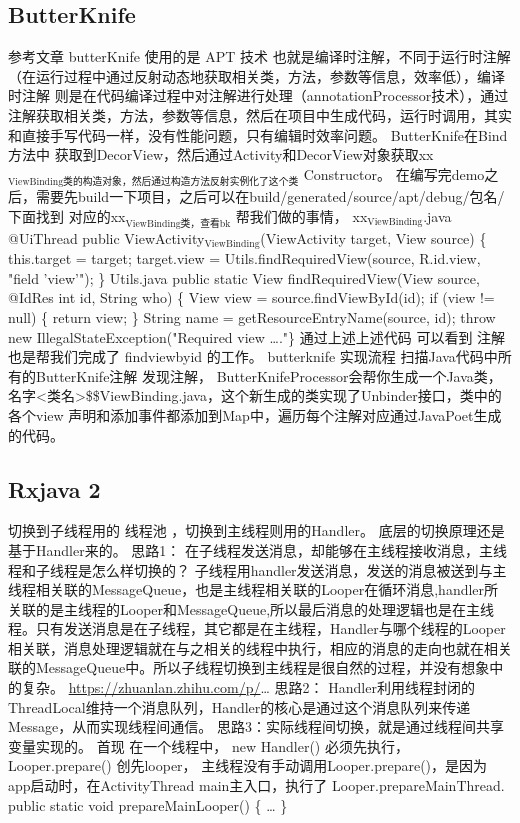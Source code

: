 \documentclass[9pt, b5paper]{article}
\begin{document}
\subsection{ButterKnife}
\label{sec-8-3}
参考文章
butterKnife 使用的是 APT 技术 也就是编译时注解，不同于运行时注解（在运行过程中通过反射动态地获取相关类，方法，参数等信息，效率低），编译时注解 则是在代码编译过程中对注解进行处理（annotationProcessor技术），通过注解获取相关类，方法，参数等信息，然后在项目中生成代码，运行时调用，其实和直接手写代码一样，没有性能问题，只有编辑时效率问题。
ButterKnife在Bind方法中 获取到DecorView，然后通过Activity和DecorView对象获取xx$_{\text{ViewBinding类的构造对象，然后通过构造方法反射实例化了这个类}}$ Constructor。
在编写完demo之后，需要先build一下项目，之后可以在build/generated/source/apt/debug/包名/下面找到 对应的xx$_{\text{ViewBinding类，查看bk}}$ 帮我们做的事情，
xx$_{\text{ViewBinding}}$.java
@UiThread
  public ViewActivity$_{\text{ViewBinding}}$(ViewActivity target, View source) \{
    this.target = target;
    target.view = Utils.findRequiredView(source, R.id.view, "field 'view'");
  \}
Utils.java
public static View findRequiredView(View source, @IdRes int id, String who) \{
    View view = source.findViewById(id);
    if (view != null) \{
      return view;
    \}
    String name = getResourceEntryName(source, id);
    throw new IllegalStateException("Required view \ldots{}."\}
通过上述上述代码 可以看到 注解也是帮我们完成了 findviewbyid 的工作。
butterknife 实现流程
扫描Java代码中所有的ButterKnife注解
发现注解， ButterKnifeProcessor会帮你生成一个Java类，名字<类名>\$\$ViewBinding.java，这个新生成的类实现了Unbinder接口，类中的各个view 声明和添加事件都添加到Map中，遍历每个注解对应通过JavaPoet生成的代码。
\subsection{Rxjava 2}
\label{sec-8-4}
切换到子线程用的 线程池 ，切换到主线程则用的Handler。
底层的切换原理还是基于Handler来的。
思路1：
在子线程发送消息，却能够在主线程接收消息，主线程和子线程是怎么样切换的？
子线程用handler发送消息，发送的消息被送到与主线程相关联的MessageQueue，也是主线程相关联的Looper在循环消息,handler所关联的是主线程的Looper和MessageQueue,所以最后消息的处理逻辑也是在主线程。只有发送消息是在子线程，其它都是在主线程，Handler与哪个线程的Looper相关联，消息处理逻辑就在与之相关的线程中执行，相应的消息的走向也就在相关联的MessageQueue中。所以子线程切换到主线程是很自然的过程，并没有想象中的复杂。
\url{https://zhuanlan.zhihu.com/p/}\ldots{}
思路2：
Handler利用线程封闭的ThreadLocal维持一个消息队列，Handler的核心是通过这个消息队列来传递Message，从而实现线程间通信。
思路3：实际线程间切换，就是通过线程间共享变量实现的。
首现 在一个线程中， new Handler() 必须先执行，Looper.prepare() 创先looper，
主线程没有手动调用Looper.prepare()，是因为 app启动时，在ActivityThread main主入口，执行了 Looper.prepareMainThread.
public static void prepareMainLooper() \{ \ldots{} \}
\end{document}
